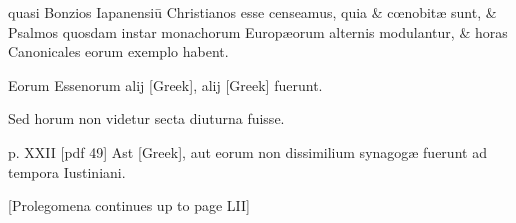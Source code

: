 \begin{parnumbers}
quasi Bonzios
Iapanensiū Christianos esse censeamus, quia \& cœnobitæ sunt,
\& Psalmos quosdam instar monachorum Europæorum alternis modulantur,
\& horas Canonicales eorum exemplo habent.

Eorum Essenorum alij \textgreek{[Greek]}, alij \textgreek{[Greek]} fuerunt.

Sed horum non videtur
secta diuturna fuisse.

\clearpage
p. XXII [pdf 49]
Ast \textgreek{[Greek]}, aut eorum non dissimilium
synagogæ fuerunt ad tempora Iustiniani.

[Prolegomena continues up to page LII]

\end{parnumbers}
